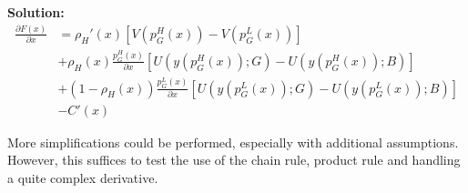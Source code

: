 \documentclass[a4paper, 12pt]{article}
\newenvironment{solution}{ \noindent \textbf{Solution: \medskip}}{}
\begin{document}
\begin{solution}
\begin{align}
	\frac{\partial F(x)}{\partial x} &= \rho_H'(x)\left[ V(p_G^H(x)) - V(p_G^L(x))\right] \nonumber \\
	&+ \rho_H(x)\frac{p_G^H(x)}{\partial x} \left[ U(y(p_G^H(x));G) - U(y(p_G^H(x));B) \right] \nonumber \\
	&+ (1-\rho_H(x))\frac{p_G^L(x)}{\partial x} \left[ U(y(p_G^L(x));G) - U(y(p_G^L(x));B) \right] \nonumber \\
	&- C'(x) \nonumber
\end{align}

More simplifications could be performed, especially with additional assumptions.
However, this suffices to test the use of the chain rule, product rule and handling a quite complex derivative.

\end{solution}
\end{document}
